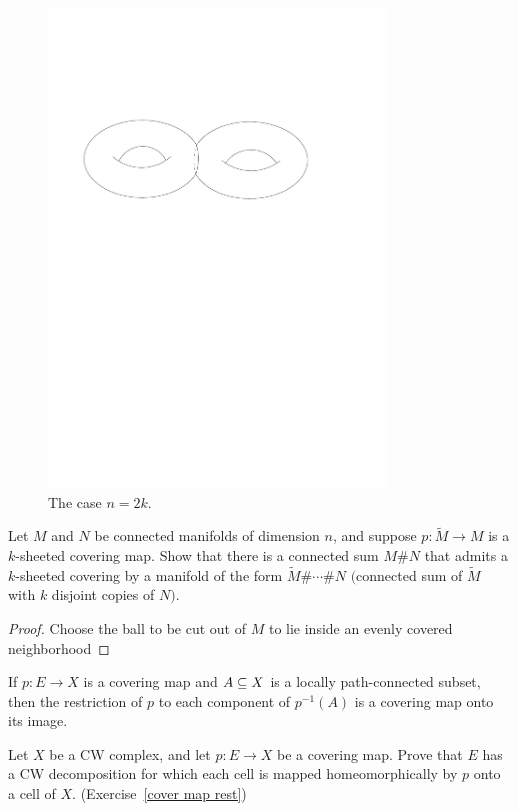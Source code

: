 \begin{example}
\begin{figure}[htbp]
\begin{minipage}{200pt}
\includegraphics[width=0.8\textwidth]{cover-by-tori-2}
\caption{The case $n=2k$.}
\end{minipage}
\end{figure}

\end{example}
\begin{exercise}
Let $M$ and $N$ be connected manifolds of dimension $n$, and suppose $p:\widetilde{M}\to M$ is a $k$-sheeted covering map. Show that there is a connected sum $M\#N$ that admits a $k$-sheeted covering by a manifold of the form $\widetilde{M}\#\cdots\#N$ $($connected sum of $\widetilde{M}$ with $k$ disjoint copies of $N$$)$.
\end{exercise}
\begin{proof}
Choose the ball to be cut out of $M$ to lie inside an evenly covered neighborhood
\end{proof}
\begin{exercise}\label{cover map rest}
If $p:E\to X$ is a covering map and $A\subseteq X$ is a locally path-connected subset, then the restriction of $p$ to each component of $p^{-1}(A)$ is a covering map onto its image.
\end{exercise}
\begin{exercise}
Let $X$ be a CW complex, and let $p:E\to X$ be a covering map. Prove that $E$ has a CW decomposition for which each cell is mapped homeomorphically by $p$ onto a cell 
of $X$.  (Exercise~\ref{cover map rest})
\end{exercise}
